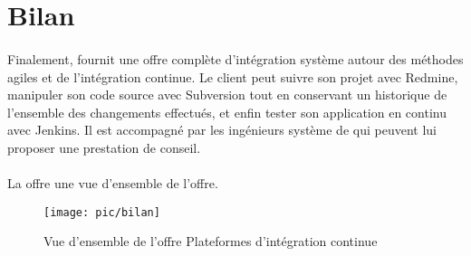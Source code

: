 \section{Bilan}

\paragraph{}
Finalement, \asmile{} fournit une offre complète d'intégration système autour des méthodes agiles et de l'intégration continue.
Le client peut suivre son projet avec Redmine, manipuler son code source avec Subversion tout en conservant un historique de l'ensemble des changements effectués, et enfin tester son application en continu avec Jenkins.
Il est accompagné par les ingénieurs système de \asmile{} qui peuvent lui proposer une prestation de conseil.

\paragraph{}
La  offre une vue d'ensemble de l'offre.

\begin{figure}
	\centering
	\texttt{[image: pic/bilan]}
	\caption{Vue d'ensemble de l'offre \og Plateformes d'intégration continue \fg}
	\label{figure:pic:bilan}
\end{figure}


